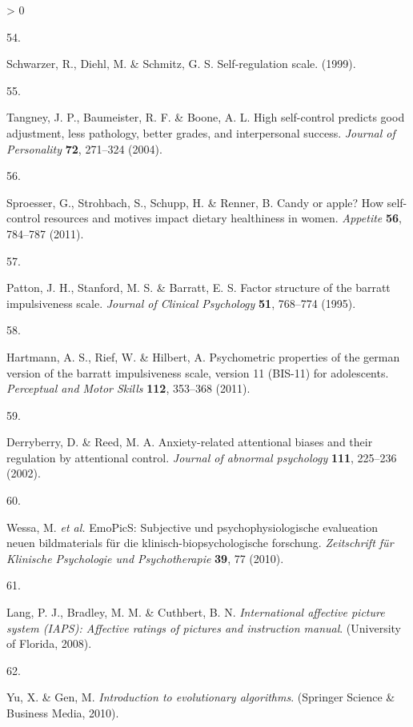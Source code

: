 \documentclass[
  english,
  man,floatsintext]{apa6}
\newlength{\cslhangindent}
\newlength{\csllabelwidth}
\newenvironment{CSLReferences}[2] %
 {%
  \setlength{\parindent}{0pt}
  \ifodd #1 \everypar{\setlength{\hangindent}{\cslhangindent}}\ignorespaces\fi
  \ifnum #2 > 0
  \setlength{\parskip}{#2\baselineskip}
  \fi
 }%
 {}
\newcommand{\CSLLeftMargin}[1]{\parbox[t]{\csllabelwidth}{#1}}
\newcommand{\CSLRightInline}[1]{\parbox[t]{\linewidth - \csllabelwidth}{#1}\break}
\begin{document}
\begin{CSLReferences}{0}{0}
\leavevmode\hypertarget{ref-Schwarzer1999}{}%
\CSLLeftMargin{54. }
\CSLRightInline{Schwarzer, R., Diehl, M. \& Schmitz, G. S. Self-regulation scale. (1999).}

\leavevmode\hypertarget{ref-Tangney2004}{}%
\CSLLeftMargin{55. }
\CSLRightInline{Tangney, J. P., Baumeister, R. F. \& Boone, A. L. High self-control predicts good adjustment, less pathology, better grades, and interpersonal success. \emph{Journal of Personality} \textbf{72}, 271--324 (2004).}

\leavevmode\hypertarget{ref-Sproesser2011}{}%
\CSLLeftMargin{56. }
\CSLRightInline{Sproesser, G., Strohbach, S., Schupp, H. \& Renner, B. Candy or apple? How self-control resources and motives impact dietary healthiness in women. \emph{Appetite} \textbf{56}, 784--787 (2011).}

\leavevmode\hypertarget{ref-Patton1995}{}%
\CSLLeftMargin{57. }
\CSLRightInline{Patton, J. H., Stanford, M. S. \& Barratt, E. S. Factor structure of the barratt impulsiveness scale. \emph{Journal of Clinical Psychology} \textbf{51}, 768--774 (1995).}

\leavevmode\hypertarget{ref-Hartmann2011}{}%
\CSLLeftMargin{58. }
\CSLRightInline{Hartmann, A. S., Rief, W. \& Hilbert, A. Psychometric properties of the german version of the barratt impulsiveness scale, version 11 (BIS-11) for adolescents. \emph{Perceptual and Motor Skills} \textbf{112}, 353--368 (2011).}

\leavevmode\hypertarget{ref-Derryberry2002}{}%
\CSLLeftMargin{59. }
\CSLRightInline{Derryberry, D. \& Reed, M. A. Anxiety-related attentional biases and their regulation by attentional control. \emph{Journal of abnormal psychology} \textbf{111}, 225--236 (2002).}

\leavevmode\hypertarget{ref-Wessa2010}{}%
\CSLLeftMargin{60. }
\CSLRightInline{Wessa, M. \emph{et al.} EmoPicS: Subjective und psychophysiologische evalueation neuen bildmaterials für die klinisch-biopsychologische forschung. \emph{Zeitschrift für Klinische Psychologie und Psychotherapie} \textbf{39}, 77 (2010).}

\leavevmode\hypertarget{ref-Lang2008}{}%
\CSLLeftMargin{61. }
\CSLRightInline{Lang, P. J., Bradley, M. M. \& Cuthbert, B. N. \emph{International affective picture system (IAPS): Affective ratings of pictures and instruction manual}. (University of Florida, 2008).}

\leavevmode\hypertarget{ref-Yu2010}{}%
\CSLLeftMargin{62. }
\CSLRightInline{Yu, X. \& Gen, M. \emph{Introduction to evolutionary algorithms}. (Springer Science \& Business Media, 2010).}


\end{CSLReferences}
\end{document}
